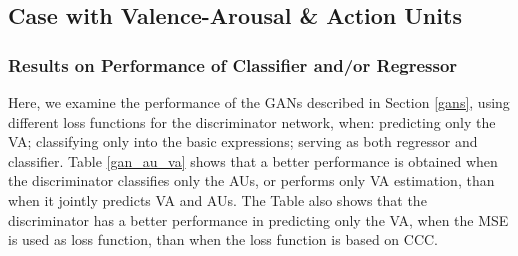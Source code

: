 \documentclass[a4paper, 10pt, conference]{ieeeconf}      %
\begin{document}
\subsection{Case with Valence-Arousal \& Action Units}



\subsubsection{Results on Performance of Classifier and/or Regressor}

Here, we examine the performance of the GANs described in Section \ref{gans}, using different loss functions for the discriminator network, when: predicting only the VA; classifying only into the basic expressions; serving as both regressor and classifier. Table \ref{gan_au_va} shows that a better performance is obtained when the discriminator classifies only the AUs, or  performs only VA estimation, than when it jointly predicts VA and AUs. The Table also shows that the discriminator has a better performance in predicting only the VA, when the MSE is used as loss function, than  when the loss function is based on CCC.
\end{document}
